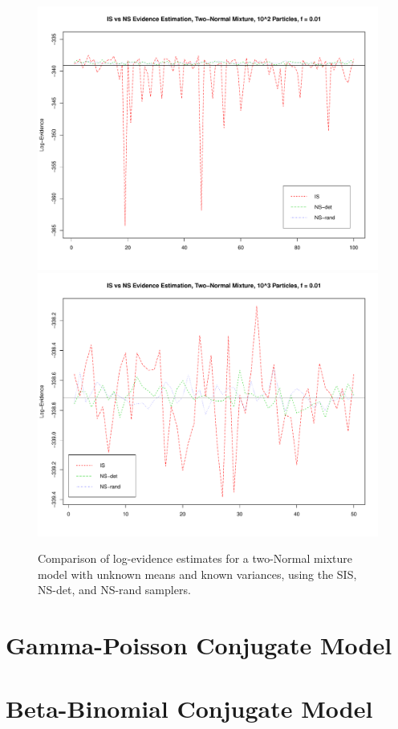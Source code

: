 \documentclass[psamsfonts]{amsart}
\begin{document}
\begin{figure}
\includegraphics[width=\textwidth]{Mix_10e2_f01.pdf}
\includegraphics[width=\textwidth]{Mix_10e3_f01.pdf}
\caption{Comparison of log-evidence estimates for a two-Normal mixture model with unknown means and known variances, using the SIS, NS-det, and NS-rand samplers.}
\end{figure}

\section{Gamma-Poisson Conjugate Model}

\section{Beta-Binomial Conjugate Model}
\end{document}
